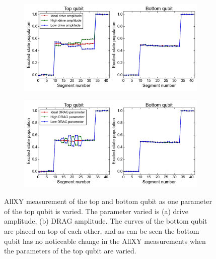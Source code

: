         \begin{figure}
        \centering
           \begin{subfigure}[b]{\textwidth}
           \includegraphics[width=1\linewidth]{Figures/Exploring frequency re-use/AllXY_drive_top.png}
           \caption{}
           \label{fig:AllXY drive top}
        \end{subfigure}

        \begin{subfigure}[b]{\textwidth}
           \includegraphics[width=1\linewidth]{Figures/Exploring frequency re-use/AllXY_drag_top.png}
           \caption{}
           \label{fig:AllXY DRAG top}
        \end{subfigure}

        \caption[Two numerical solutions]{AllXY measurement of the top and bottom qubit as one parameter of the top qubit is varied. The parameter varied is (a) drive amplitude, (b) DRAG amplitude. The curves of the bottom qubit are placed on top of each other, and as can be seen the bottom qubit has no noticeable change in the AllXY measurements when the parameters of the top qubit are varied.}
        \label{fig:AllXY individual control}
        \end{figure}

